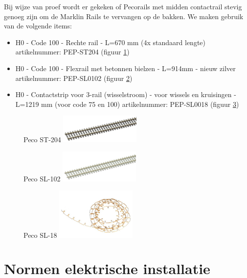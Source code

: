 \documentclass[12pt,a4paper]{report}
\begin{document}
Bij wijze van proef wordt er gekeken of Pecorails met midden contactrail stevig genoeg zijn om de Marklin Rails te vervangen op de bakken. We maken gebruik van de volgende items:

\begin{itemize}
\item H0 - Code 100 - Rechte rail - L=670 mm (4x standaard lengte) artikelnummer: PEP-ST204 (figuur \ref{pecost204})
\item H0 - Code 100 - Flexrail met betonnen bielzen - L=914mm - nieuw zilver artikelnummer: PEP-SL0102 (figuur \ref{pecosl102})
\item H0 - Contactstrip voor 3-rail (wisselstroom) - voor wissels en kruisingen - L=1219 mm (voor code 75 en 100) artikelnummer: PEP-SL0018 (figuur \ref{pecosl18})
\end{itemize}

\begin{figure}
  \captionbox
  {Peco ST-204\label{pecost204}}
  {\includegraphics[scale=1.0]{images/rcu_peco_st204}}
\end{figure}

\begin{figure}
  \captionbox
  {Peco SL-102\label{pecosl102}}
  {\includegraphics[scale=1.0]{images/rcu_peco_sl102}}
\end{figure}

\begin{figure}
  \captionbox
  {Peco SL-18\label{pecosl18}}
  {\includegraphics[scale=1.0]{images/rcu_peco_sl18}}
\end{figure}

\chapter{Normen elektrische installatie}
\label{ch:elektra}
\end{document}
